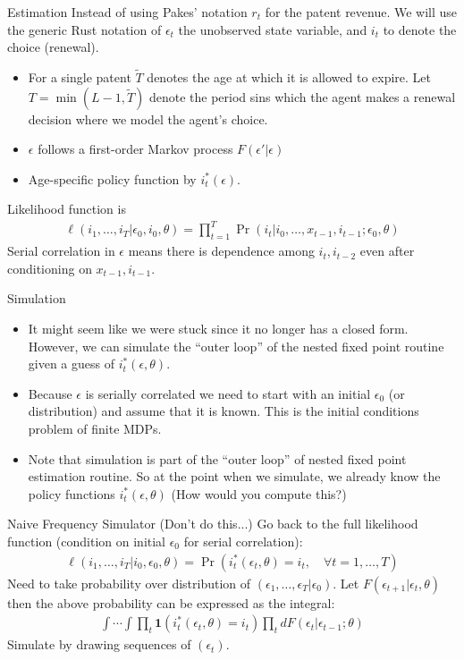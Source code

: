 \begin{frame}{Estimation}
Instead of using Pakes' notation $r_t$ for the patent revenue. We will use the generic Rust notation of $\epsilon_t$ the unobserved state variable, and $i_t$ to denote the choice (renewal).
\begin{itemize}
\item For a single patent $\tilde{T}$ denotes the age at which it is allowed to expire. Let $T = \min(L-1,\tilde{T})$ denote the period sins which the agent makes a renewal decision where we model the agent's choice.
\item $\epsilon$ follows a first-order Markov process $F(\epsilon' | \epsilon)$
\item Age-specific policy function by $i^*_t(\epsilon)$.
\end{itemize}
Likelihood function is 
\begin{eqnarray*}
\ell(i_1,\ldots,i_T | \epsilon_0,i_0,\theta) = \prod_{t=1}^T \Pr(i_t | i_0, \ldots,  x_{t-1}, i_{t-1} ; \epsilon_0, \theta)
\end{eqnarray*}
Serial correlation in $\epsilon$ means there is dependence among $i_{t}, i_{t-2}$ even after conditioning on $x_{t-1},i_{t-1}$. 
\end{frame}

\begin{frame}{Simulation}
\begin{itemize}
\item It might seem like we were stuck since it no longer has a closed form.  However, we can simulate the ``outer loop'' of the nested fixed point routine given a guess  of $i^*_t(\epsilon,\theta)$.
\item Because $\epsilon$ is serially correlated we need to start with an initial $\epsilon_0$ (or distribution) and assume that it is known.  This is the \alert{initial conditions problem} of finite MDPs.
\item Note that simulation is part of the ``outer loop'' of nested fixed point estimation routine. So at the point when we simulate, we already know the policy functions $i_t^{*}(\epsilon,\theta)$ (How would you compute this?)
\end{itemize}
\end{frame}

\begin{frame}{Naive Frequency Simulator (Don't do this...)}
Go back to the full likelihood function (condition on initial $\epsilon_0$ for serial correlation):
\begin{align*}
\ell(i_1,\ldots,i_T | i_0, \epsilon_0, \theta) = \Pr(i_t^{*} (\epsilon_t,\theta) = i_t, \quad \forall t =1,\ldots,T)
\end{align*}
Need to take probability over distribution of $(\epsilon_1,\ldots,\epsilon_T | \epsilon_0)$.  Let $F(\epsilon_{t+1} | \epsilon_t,\theta)$ then the above probability can be expressed as the integral:
\begin{align*}
\int \cdots \int \prod_t \mathbf{1}(i_t^{*}(\epsilon_t,\theta) = i_t) \prod_t d F(\epsilon_t | \epsilon_{t-1}; \theta)
\end{align*}
Simulate by drawing sequences of $(\epsilon_t)$.
\end{frame}


